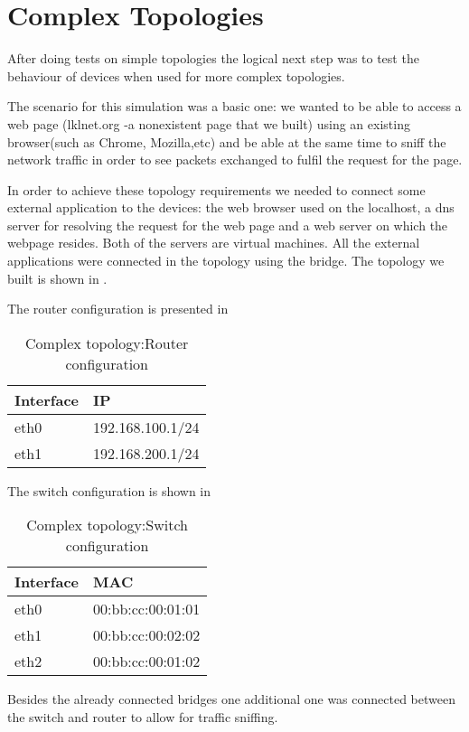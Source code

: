 \section{Complex Topologies}
\label{sec:complex-top}
After doing tests on simple topologies the logical next step was to test the behaviour of \project devices when used for more complex topologies. 

The scenario for this simulation was a basic one: we wanted to be able to access a web page 
(lklnet.org -a nonexistent page that we built) using an existing browser(such as Chrome, Mozilla,etc) 
and be able at the same time to sniff the network traffic in order to see packets exchanged to fulfil the request for the page.

In order to achieve these topology requirements we needed to connect some external application to 
the \project devices: the web browser used on the localhost, a dns server for resolving the request for 
the web page and a web server on which the webpage resides. Both of the servers are virtual machines.
All the external applications were connected in the topology using the bridge.  
The topology we built is shown in .

The router configuration is presented in 
\begin{center}
  \begin{table}[htb]
  \begin{center}
  \begin{tabular}{| l | l |}
	\hline
	Interface & IP \\ \hline
	eth0 & 192.168.100.1/24 \\ \hline
	eth1 & 192.168.200.1/24 \\	 
    \hline
  \end{tabular}
  \end{center}
  \caption{Complex topology:Router configuration}
  \label{table:complex-router}
  \end{table}
\end{center}
The switch configuration is shown in 
\begin{center}
  \begin{table}[htb]
  \begin{center}
  \begin{tabular}{| l | l |}
    \hline
	Interface & MAC\\ \hline
	eth0 & 00:bb:cc:00:01:01\\ \hline
	eth1 & 00:bb:cc:00:02:02\\ \hline
	eth2 & 00:bb:cc:00:01:02\\
    \hline
  \end{tabular}
  \end{center}
  \caption{Complex topology:Switch configuration}
  \label{table:complex-switch}
  \end{table}
\end{center}
Besides the already connected bridges one additional one was connected between the switch and router to allow for traffic sniffing.

